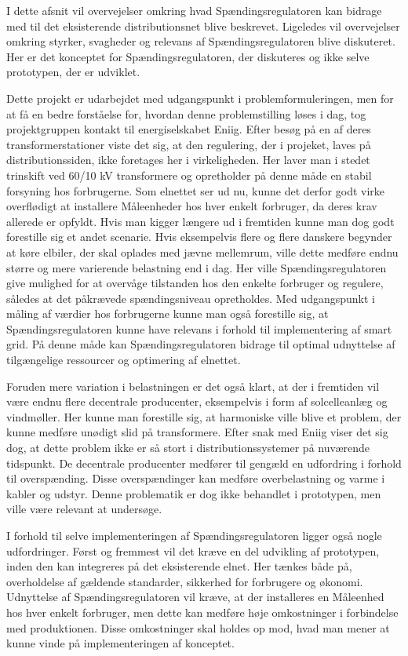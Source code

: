 

I dette afsnit vil overvejelser omkring hvad Spændingsregulatoren kan bidrage med til det eksisterende distributionsnet blive beskrevet. Ligeledes vil overvejelser omkring styrker, svagheder og relevans af Spændingsregulatoren blive diskuteret. Her er det konceptet for Spændingsregulatoren, der diskuteres og ikke selve prototypen, der er udviklet. 

Dette projekt er udarbejdet med udgangspunkt i problemformuleringen, men for at få en bedre forståelse for, hvordan denne problemstilling løses i dag, tog projektgruppen kontakt til energiselskabet Eniig. Efter besøg på en af deres transformerstationer viste det sig, at den regulering, der i projeket, laves på distributionssiden, ikke foretages her i virkeligheden. Her laver man i stedet trinskift ved 60/10 kV transformere og opretholder på denne måde en stabil forsyning hos forbrugerne. Som elnettet ser ud nu, kunne det derfor godt virke overflødigt at installere Måleenheder hos hver enkelt forbruger, da deres krav allerede er opfyldt. Hvis man kigger længere ud i fremtiden kunne man dog godt forestille sig et andet scenarie. Hvis eksempelvis flere og flere danskere begynder at køre elbiler, der skal oplades med jævne mellemrum, ville dette medføre endnu større og mere varierende belastning end i dag. Her ville Spændingsregulatoren give mulighed for at overvåge tilstanden hos den enkelte forbruger og regulere, således at det påkrævede spændingsniveau opretholdes. 
Med udgangspunkt i måling af værdier hos forbrugerne kunne man også forestille sig, at Spændingsregulatoren kunne have relevans i forhold til implementering af smart grid. På denne måde kan Spændingsregulatoren bidrage til optimal udnyttelse af tilgængelige ressourcer og optimering af elnettet. 

Foruden mere variation i belastningen er det også klart, at der i fremtiden vil være endnu flere decentrale producenter, eksempelvis i form af solcelleanlæg og vindmøller. Her kunne man forestille sig, at harmoniske ville blive et problem, der kunne medføre unødigt slid på transformere. Efter snak med Eniig viser det sig dog, at dette problem ikke er så stort i distributionssystemer på nuværende tidspunkt. De decentrale producenter medfører til gengæld en udfordring i forhold til overspænding. Disse overspændinger kan medføre overbelastning og varme i kabler og udstyr. Denne problematik er dog ikke behandlet i prototypen, men ville være relevant at undersøge.

I forhold til selve implementeringen af Spændingsregulatoren ligger også nogle udfordringer. Først og fremmest vil det kræve en del udvikling af prototypen, inden den kan integreres på det eksisterende elnet. Her tænkes både på, overholdelse af gældende standarder, sikkerhed for forbrugere og økonomi. Udnyttelse af Spændingsregulatoren vil kræve, at der installeres en Måleenhed hos hver enkelt forbruger, men dette kan medføre høje omkostninger i forbindelse med produktionen. Disse omkostninger skal holdes op mod, hvad man mener at kunne vinde på implementeringen af konceptet. 



